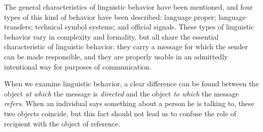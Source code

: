 \documentclass[twoside,symmetric,nobib,justified]{tufte-book}
\begin{document}
The general characteristics of linguistic behavior have been mentioned,
and four types of this kind of behavior have been described: language
proper; language transfers; technical symbol systems; and official
signals. These types of linguistic behavior vary in complexity and
formality, but all share the essential characteristic of linguistic
behavior: they carry a message for which the sender can be made
responsible, and they are properly usable in an admittedly intentional
way for purposes of communication.

When we examine linguistic behavior, a clear difference can be found
between the object \emph{at which} the message is \emph{directed} and
the object \emph{to which} the message \emph{refers}. When an individual
says something about a person he is talking to, these two objects
coincide, but this fact should not lead us to confuse the role of
recipient with the object of reference.
\end{document}
